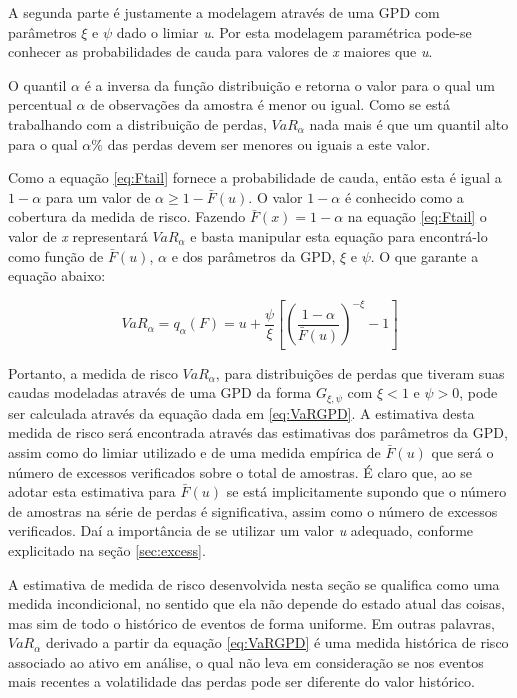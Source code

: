 \documentclass[1p]{elsarticle}
\theoremstyle{definition}
\begin{document}
A segunda parte é justamente a modelagem através de uma GPD com parâmetros $\xi$ e $\psi$ dado o limiar \emph{u}. Por esta modelagem paramétrica pode-se conhecer as probabilidades de cauda para valores de \emph{x} maiores que \emph{u}.

O quantil $\alpha$ é a inversa da função distribuição e retorna o valor para o qual um percentual $\alpha$ de observações da amostra é menor ou igual. Como se está trabalhando com a distribuição de perdas, $VaR_\alpha$ nada mais é que um quantil alto para o qual $\alpha \%$ das perdas devem ser menores ou iguais a este valor.

Como a equação \eqref{eq:Ftail} fornece a probabilidade de cauda, então esta é igual a $1- \alpha$ para um valor de $\alpha  \geq 1-\bar{F}(u)$. O valor $1- \alpha$ é conhecido como a cobertura da medida de risco. Fazendo $\bar{F}(x)=1-\alpha$ na equação \eqref{eq:Ftail} o valor de \emph{x} representará $VaR_\alpha$ e basta manipular esta equação para encontrá-lo como função de $\bar{F}(u)$, $\alpha$ e dos parâmetros da GPD, $\xi$ e $\psi$. O que garante a equação abaixo:

\begin{equation}
\label{eq:VaRGPD}
VaR_\alpha = q_\alpha(F) = u+\frac{\psi}{\xi}\left[ \left( \frac{1-\alpha}{\bar{F}(u)}\right)^{-\xi}-1 \right]
\end{equation}

Portanto, a medida de risco $VaR_\alpha$, para distribuições de perdas que tiveram suas caudas modeladas através de uma GPD da forma $G_{\xi, \psi}$ com $\xi <1 \text{ e } \psi > 0$, pode ser calculada através da equação dada em \eqref{eq:VaRGPD}. A estimativa desta medida de risco será encontrada através das estimativas dos parâmetros da GPD, assim como do limiar utilizado e de uma medida empírica de $\bar{F}(u)$ que será o número de excessos verificados sobre o total de amostras. É claro que, ao se adotar esta estimativa para $\bar{F}(u)$ se está implicitamente supondo que o número de amostras na série de perdas é significativa, assim como o número de excessos verificados. Daí a importância de se utilizar um valor \emph{u} adequado, conforme explicitado na seção \ref{sec:excess}.

A estimativa de medida de risco desenvolvida nesta seção se qualifica como uma medida incondicional, no sentido que ela não depende do estado atual das coisas, mas sim de todo o histórico de eventos de forma uniforme. Em outras palavras, $VaR_\alpha$ derivado a partir da equação \eqref{eq:VaRGPD} é uma medida histórica de risco associado ao ativo em análise, o qual não leva em consideração se nos eventos mais recentes a volatilidade das perdas pode ser diferente do valor histórico.
\end{document}
